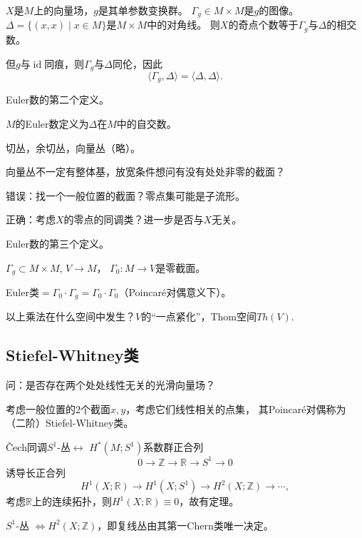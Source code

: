     \qquad $X$是$M$上的向量场，$g$是其单参数变换群。
    $\Gamma_g \in M\times M$是$g$的图像。
    $\Delta=\{(x,x)\mid x\in M\}$是$M\times M$中的对角线。
    则$X$的奇点个数等于$\Gamma_g$与$\Delta$的相交数。

    \qquad 但$g$与$\operatorname{id}$同痕，则$\Gamma_g$与$\Delta$同伦，因此
    $$\langle \Gamma_g, \Delta \rangle = \langle \Delta, \Delta \rangle.$$

\begin{definition} Euler数的第二个定义。

    \qquad $M$的Euler数定义为$\Delta$在$M$中的自交数。
\end{definition}

切丛，余切丛，向量丛（略）。

\qquad 向量丛不一定有整体基，放宽条件想问有没有处处非零的截面？

\qquad \qquad 错误：找一个一般位置的截面？零点集可能是子流形。

\qquad \qquad 正确：考虑$X$的零点的同调类？进一步是否与$X$无关。

\begin{definition} Euler数的第三个定义。

    \qquad $\Gamma_g \subset M \times M$, $V \rightarrow M$，
    $\Gamma_0: M \rightarrow V$是零截面。

    \qquad Euler类$= \Gamma_0 \cdot \Gamma_g = \Gamma_0 \cdot \Gamma_0$（Poincaré对偶意义下）。

    \qquad 以上乘法在什么空间中发生？$V$的``一点紧化''，Thom空间$Th(V)$.
\end{definition}

\subsection{Stiefel-Whitney类}

\qquad 问：是否存在两个处处线性无关的光滑向量场？

\qquad 考虑一般位置的$2$个截面$x, y$，考虑它们线性相关的点集，
其Poincaré对偶称为（二阶）Stiefel-Whitney类。

\qquad Čech同调$S^1$-丛$\leftrightarrow$ $H^*(M;S^1)$系数群正合列
        $$0 \rightarrow \mathbb{Z} \rightarrow \mathbb{R} \rightarrow S^1 \rightarrow 0$$
诱导长正合列
        $$H^1(X; \mathbb{R}) \rightarrow H^1(X; S^1) \rightarrow H^2(X; \mathbb{Z}) \rightarrow \cdots,$$
考虑$\mathbb{R}$上的连续拓扑，则$H^1(X; \mathbb{R})\equiv 0$，故有定理。

\begin{theorem}\label{thm-Chern}
    $S^1$-丛 $\iff H^2(X; \mathbb{Z})$，即复线丛由其第一Chern类唯一决定。
\end{theorem}

